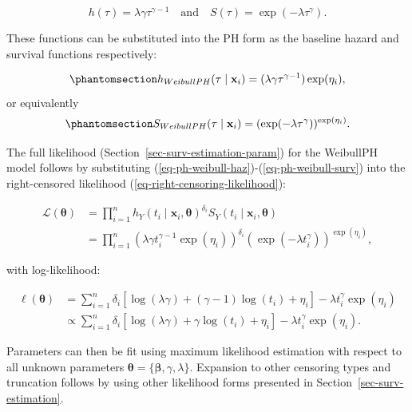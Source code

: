 \documentclass[
  letterpaper,
  krantz2]{style/krantz}
\begin{document}
\[
h(\tau) = \lambda\gamma \tau^{\gamma-1} \quad \text{and} \quad S(\tau) = \exp(-\lambda \tau^\gamma).
\]

These functions can be substituted into the PH form as the baseline
hazard and survival functions respectively:

\begin{equation}\phantomsection\label{eq-ph-weibull-haz}{
h_{WeibullPH}(\tau \mid \mathbf{x}_i)= (\lambda\gamma \tau^{\gamma-1}) \exp(\eta_i),
}\end{equation} or equivalently
\begin{equation}\phantomsection\label{eq-ph-weibull-surv}{
S_{WeibullPH}(\tau \mid \mathbf{x}_i)= (\exp(-\lambda \tau^\gamma))^{\exp(\eta_i)}.
}\end{equation}

The full likelihood (Section~\ref{sec-surv-estimation-param}) for the
WeibullPH model follows by substituting
(\ref{eq-ph-weibull-haz})-(\ref{eq-ph-weibull-surv}) into the
right-censored likelihood (\ref{eq-right-censoring-likelihood}):

\[
\begin{aligned}
\mathcal{L}(\boldsymbol{\theta}) &= \prod_{i=1}^n h_Y(t_i \mid \mathbf{x}_i, \boldsymbol{\theta})^{\delta_i}S_Y(t_i \mid \mathbf{x}_i, \boldsymbol{\theta}) \\
&= \prod_{i=1}^n \left(\lambda\gamma t_i^{\gamma-1} \exp\left(\eta_i\right)\right)^{\delta_i}\left(\exp\left(-\lambda t_i^\gamma\right)\right)^{\exp(\eta_i)},
\end{aligned}
\]

with log-likelihood:

\[
\begin{aligned}
\ell(\boldsymbol{\theta}) &= \sum_{i=1}^n \delta_i[\log(\lambda\gamma) + (\gamma-1)\log(t_i) + \eta_i] - \lambda t_i^\gamma\exp(\eta_i) \\
&\propto \sum_{i=1}^n \delta_i[\log(\lambda\gamma) + \gamma\log(t_i) + \eta_i] - \lambda t_i^\gamma \exp(\eta_i).
\end{aligned}
\]

Parameters can then be fit using maximum likelihood
estimation with respect to all
unknown parameters
\(\boldsymbol{\theta}= \{\boldsymbol{\beta}, \gamma, \lambda\}\).
Expansion to other censoring types and truncation follows by using other
likelihood forms presented in Section~\ref{sec-surv-estimation}.
\end{document}
